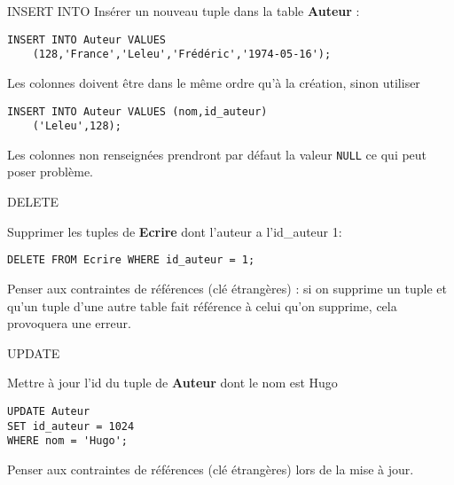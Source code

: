 \documentclass[10pt]{beamer}
\begin{document}
\begin{frame}[fragile]{INSERT INTO}
Insérer un nouveau tuple dans la table \textbf{Auteur} :\pause
\begin{verbatim}
INSERT INTO Auteur VALUES
    (128,'France','Leleu','Frédéric','1974-05-16');
\end{verbatim}
\pause
Les colonnes doivent être dans le même ordre qu'à la création, sinon utiliser\pause
\begin{verbatim}
INSERT INTO Auteur VALUES (nom,id_auteur)
    ('Leleu',128);
\end{verbatim}
\pause
Les colonnes non renseignées prendront par défaut la valeur \texttt{NULL} ce qui peut poser problème.
\end{frame}

\begin{frame}[fragile]{DELETE}

Supprimer les tuples de \textbf{Ecrire} dont l'auteur a l'id\_auteur 1:\pause
\begin{verbatim}
DELETE FROM Ecrire WHERE id_auteur = 1;
\end{verbatim}
\pause
Penser aux contraintes de références (clé étrangères) : si on supprime un tuple et qu'un tuple d'une autre table fait référence à celui qu'on supprime, cela provoquera une erreur.
\end{frame}

\begin{frame}[fragile]{UPDATE}

	Mettre à jour l'id du tuple de \textbf{Auteur} dont le nom est Hugo\pause
	\begin{verbatim}
UPDATE Auteur
SET id_auteur = 1024
WHERE nom = 'Hugo';
	\end{verbatim}
    \pause
Penser aux contraintes de références (clé étrangères) lors de la mise à jour.
\end{frame}
\end{document}
